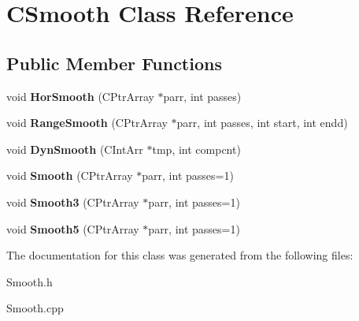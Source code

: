 \hypertarget{class_c_smooth}{\section{C\-Smooth Class Reference}
\label{class_c_smooth}
}
\subsection*{Public Member Functions}
\begin{DoxyCompactItemize}
\item 
\hypertarget{class_c_smooth_aa071025200e03770a20f5f6c007c3eb7}{void {\bfseries Hor\-Smooth} (C\-Ptr\-Array $\ast$parr, int passes)}\label{class_c_smooth_aa071025200e03770a20f5f6c007c3eb7}

\item 
\hypertarget{class_c_smooth_a7a39f2ef587d58161a89855f4a8f894a}{void {\bfseries Range\-Smooth} (C\-Ptr\-Array $\ast$parr, int passes, int start, int endd)}\label{class_c_smooth_a7a39f2ef587d58161a89855f4a8f894a}

\item 
\hypertarget{class_c_smooth_a1180f1b591f75aa267be2b77ebb8b40b}{void {\bfseries Dyn\-Smooth} (C\-Int\-Arr $\ast$tmp, int compcnt)}\label{class_c_smooth_a1180f1b591f75aa267be2b77ebb8b40b}

\item 
\hypertarget{class_c_smooth_a42e3c4255c0c93dcf47fc7f652a5f90c}{void {\bfseries Smooth} (C\-Ptr\-Array $\ast$parr, int passes=1)}\label{class_c_smooth_a42e3c4255c0c93dcf47fc7f652a5f90c}

\item 
\hypertarget{class_c_smooth_a7bb7f9015aabcfc44f44099dc334a0f7}{void {\bfseries Smooth3} (C\-Ptr\-Array $\ast$parr, int passes=1)}\label{class_c_smooth_a7bb7f9015aabcfc44f44099dc334a0f7}

\item 
\hypertarget{class_c_smooth_a3aa1e35a2f91d56936a060cfbde7582c}{void {\bfseries Smooth5} (C\-Ptr\-Array $\ast$parr, int passes=1)}\label{class_c_smooth_a3aa1e35a2f91d56936a060cfbde7582c}

\end{DoxyCompactItemize}


The documentation for this class was generated from the following files\-:\begin{DoxyCompactItemize}
\item 
Smooth.\-h\item 
Smooth.\-cpp\end{DoxyCompactItemize}
